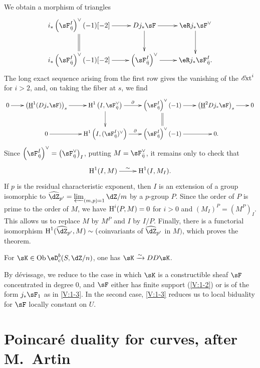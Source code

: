 We obtain a morphism of triangles
\[\xymatrix{
  i_\ast\left(\sF_{\bar\eta}^I\right)^\vee (-1)[-2] \ar[r] \ar@{=}[d]
    & D j_\ast\sF \ar[r] \ar[d]
    & \eR j_\ast \sF^\vee \ar[d] \\
  i_\ast\left(\sF_{\bar\eta}^I\right)^\vee(-1)[-2] \ar[r]
    & \left(\sF_{\bar\eta}^I\right)^\vee \ar[r]
    & \eR j_\ast \sF_{\bar\eta}^I \text{.}
}\]
The long exact sequence arising from the first row gives the vanishing of the
$\operatorname{\mathscr{E}\!xt}^i$ for $i>2$, and, on taking the fiber at $s$, we find
\[\xymatrix@=0.7cm{
  0 \ar[r]
    & \left(\underline\h^1(D j_\ast\sF)\right)_s \ar[r]
    & \h^1\left(I,\sF_{\bar\eta}^\vee\right) \ar[r]^-\partial \ar[d]
    & \left(\sF_{\bar\eta}^I\right)^\vee(-1) \ar[r] \ar@{=}[d]
    & \left(\underline\h^2 D j_\ast\sF\right)_s \ar[r]
    & 0 \\
  & 0 \ar[r]
    & \h^1\left(I,(\sF_{\bar\eta}^I)^\vee\right) \ar[r]^-\partial
    & \left(\sF_{\bar\eta}^I\right)^\vee(-1) \ar[r]
    & 0 \text{.}
}\]
Since
$\left(\sF_{\bar\eta}^I\right)^\vee = \left(\sF_{\bar\eta}^\vee\right)_I$,
putting $M=\sF_{\bar\eta}^\vee$, it remains only to check that
\[\xymatrix{
  \h^1(I,M) \ar[r]^-\sim
    & \h^1(I,M_I) \text{.}
}\]
If $p$ is the residual characteristic exponent, then $I$ is an extension of
a group isomorphic to $\widehat\dZ_{p'} = \varprojlim_{(m,p)=1} \dZ/m$ by a
$p$-group $P$. Since the order of $P$ is prime to the order of $M$, we have
$\operatorname{H}^i(P,M)=0$ for $i>0$ and $(M_I)^P=(M^P)_I$. This allows us to replace $M$
by $M^P$ and $I$ by $I/P$. Finally, there is a functorial isomorphism
$\h^1(\widehat\dZ_{p'},M)\sim ($coinvariants of $\widehat\dZ_{p'}$ in $M)$,
which proves the theorem.


\begin{theorem_}\label{V:1-4}
For $\sK\in \ob\eD_c^b(S,\dZ/n)$, one has $\sK\iso D D \sK$.
\end{theorem_}

By dévissage, we reduce to the case in which $\sK$ is a constructible sheaf
$\sF$ concentrated in degree $0$, and $\sF$ either has finite support
(\ref{V:1-2}) or is of the form $j_\ast\sF_1$ as in \ref{V:1-3}. In the
second case, \ref{V:1-3} reduces us to local biduality for $\sF$ locally
constant on $U$.


\section{Poincaré duality for curves, after M.\ Artin}\label{V:2}


\subsection{}\label{V:2-1}

